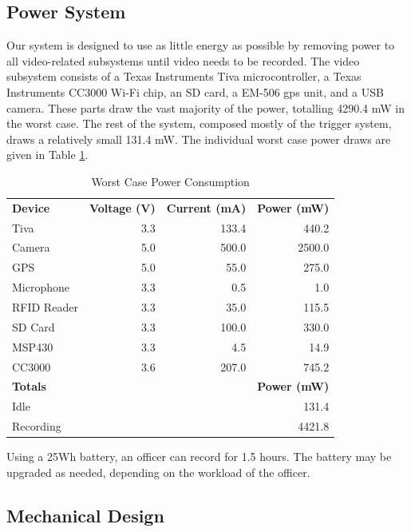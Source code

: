 \documentclass[12pt]{article}
\begin{document}
\subsection{Power System}
Our system is designed to use as little energy as possible by removing power to
all video-related subsystems until video needs to be recorded. The video
subsystem consists of a Texas Instruments Tiva
microcontroller\cite[p.~1880]{tm4c1294ncpdt}, a Texas Instruments CC3000 Wi-Fi
chip\cite[p.~6]{cc3000}, an SD card\cite[p.~19,23]{sd_standard}, a EM-506 \gls{gps}
unit\cite[p.~10]{em506}, and a USB camera\cite[p.~245]{usb_standard}. These
parts draw the vast majority of the power, totalling 4290.4 mW in the worst case.
The rest of the system, composed mostly of the trigger system, draws a relatively small 131.4 mW. The individual worst
case power draws are given in Table \ref{tab:worst_case_power}.

\begin{table}[h!]
    \centering
    \caption{Worst Case Power Consumption}
    \begin{tabular}{lrrr}
        \textbf{Device} & \textbf{Voltage (V)} & \textbf{Current (mA)} & \textbf{Power (mW)}\\
        Tiva & 3.3 & 133.4 & 440.2\\
        Camera & 5.0 & 500.0 & 2500.0\\
        GPS & 5.0 & 55.0 & 275.0\\
        Microphone & 3.3 & 0.5 & 1.0\\
        RFID Reader & 3.3 & 35.0 & 115.5\\
        SD Card & 3.3 & 100.0 & 330.0\\
        MSP430 & 3.3 & 4.5 & 14.9\\
        CC3000 & 3.6 & 207.0 & 745.2\\
        \hline
        \textbf{Totals} & & & \textbf{Power (mW)}\\
        Idle & & & 131.4\\
        Recording & & & 4421.8\\
    \end{tabular}
    \label{tab:worst_case_power}
\end{table}

Using a 25Wh battery, an officer can record for 1.5 hours. The battery may be
upgraded as needed, depending on the workload of the officer.

\subsection{Mechanical Design}
\end{document}
